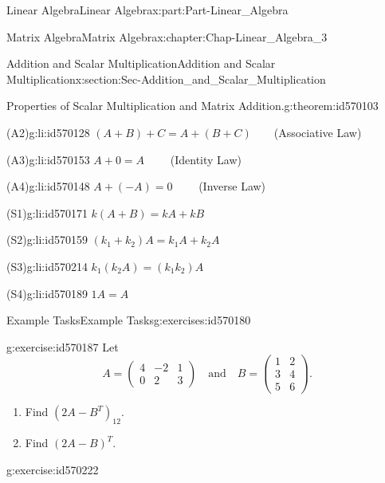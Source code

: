 \documentclass[oneside,10pt,]{book}
\numberwithin{equation}{section}
\newcommand{\amp}{&}
\begin{document}
\begin{partptx}{Linear Algebra}{}{Linear Algebra}{}{}{x:part:Part-Linear_Algebra}
\begin{chapterptx}{Matrix Algebra}{}{Matrix Algebra}{}{}{x:chapter:Chap-Linear_Algebra_3}
\begin{sectionptx}{Addition and Scalar Multiplication}{}{Addition and Scalar Multiplication}{}{}{x:section:Sec-Addition_and_Scalar_Multiplication}
\begin{theorem}{Properties of Scalar Multiplication and Matrix Addition.}{}{g:theorem:id570103}
\begin{descriptionlist}
\begin{dlimedium}{(A2)}{g:li:id570128}%
 \((A+B)+C = A+(B+C)  \qquad \)(Associative Law)\end{dlimedium}%
\begin{dlimedium}{(A3)}{g:li:id570153}%
 \(A+0 = A \qquad \) (Identity Law)\end{dlimedium}%
\begin{dlimedium}{(A4)}{g:li:id570148}%
 \(A+(-A) = 0 \qquad \) (Inverse Law)\end{dlimedium}%
\begin{dlimedium}{(S1)}{g:li:id570171}%
 \(k(A+B) = kA+kB\)\end{dlimedium}%
\begin{dlimedium}{(S2)}{g:li:id570159}%
 \((k_1 + k_2)A= k_1A + k_2A\)\end{dlimedium}%
\begin{dlimedium}{(S3)}{g:li:id570214}%
 \(k_1(k_2A) = (k_1k_2)A\)\end{dlimedium}%
\begin{dlimedium}{(S4)}{g:li:id570189}%
 \(1A = A\)\end{dlimedium}%
\end{descriptionlist}
%
\end{theorem}
%
%
\typeout{************************************************}
\typeout{************************************************}
%
\begin{exercises-subsection-numberless}{Example Tasks}{}{Example Tasks}{}{}{g:exercises:id570180}
\begin{divisionexercise}{1}{}{}{g:exercise:id570187}%
Let%
\begin{equation*}
A = \begin{pmatrix}4 \amp -2 \amp 1\\ 0 \amp 2 \amp 3\end{pmatrix} \quad \mbox{and} \quad B=\begin{pmatrix}1 \amp 2 \\ 3 \amp 4 \\ 5 \amp 6\end{pmatrix}.
\end{equation*}
%
\begin{enumerate}[label=\alph*]
\item{}Find \((2A-B^{T})_{12}\).%
\item{}Find \((2A-B)^T\).%
\end{enumerate}
%
\end{divisionexercise}%
\begin{divisionexercise}{2}{}{}{g:exercise:id570222}%

\end{divisionexercise}
\end{exercises-subsection-numberless}
\end{sectionptx}
\end{chapterptx}
\end{partptx}
\end{document}
